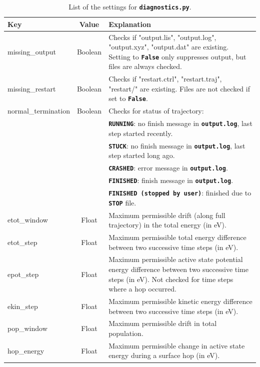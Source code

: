 \documentclass[a4paper,10pt,DIV=15,openany]{scrbook}
\newcommand{\ttt}[1]{\textbf{\texttt{#1}}}
\begin{document}
\begin{table}
  \centering
  \caption{List of the settings for \ttt{diagnostics.py}.}
  \label{tab:diagnostics}
  \begin{tabular}{>{\ttfamily}lcp{11cm}}
    \hline
    Key  &Value     &Explanation\\
    \hline
    missing\_output     &Boolean        &Checks if "output.lis", "output.log", "output.xyz", "output.dat" are existing. Setting to \ttt{False} only suppresses output, but files are always checked.\\
    missing\_restart    &Boolean        &Checks if "restart.ctrl", "restart.traj", "restart/" are existing. Files are not checked if set to \ttt{False}.\\
    normal\_termination &Boolean        &Checks for status of trajectory:\\
                                       &&\ttt{RUNNING}: no finish message in \ttt{output.log}, last step started recently.\\
                                       &&\ttt{STUCK}: no finish message in \ttt{output.log}, last step started long ago.\\
                                       &&\ttt{CRASHED}: error message in \ttt{output.log}.\\
                                       &&\ttt{FINISHED}: finish message in \ttt{output.log}.\\
                                       &&\ttt{FINISHED (stopped by user)}: finished due to \ttt{STOP} file.\\
    etot\_window        &Float          &Maximum permissible drift (along full trajectory) in the total energy (in eV).\\
    etot\_step          &Float          &Maximum permissible total energy difference between two successive time steps (in eV).\\
    epot\_step          &Float          &Maximum permissible active state potential energy difference between two successive time steps (in eV). Not checked for time steps where a hop occurred.\\
    ekin\_step          &Float          &Maximum permissible kinetic energy difference between two successive time steps (in eV).\\
    pop\_window         &Float          &Maximum permissible drift in total population.\\
    hop\_energy         &Float          &Maximum permissible change in active state energy during a surface hop (in eV).\\

\end{tabular}
\end{table}
\end{document}
